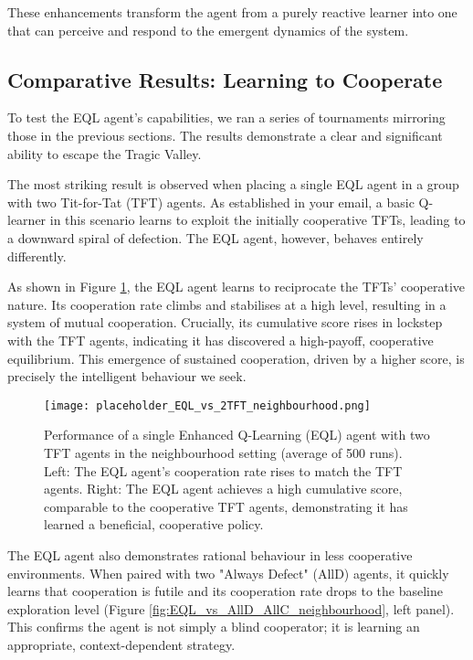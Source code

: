 \documentclass[]{llncs} %
\begin{document}
These enhancements transform the agent from a purely reactive learner into one that can perceive and respond to the emergent dynamics of the system.

\subsection{Comparative Results: Learning to Cooperate}

To test the EQL agent's capabilities, we ran a series of tournaments mirroring those in the previous sections. The results demonstrate a clear and significant ability to escape the Tragic Valley.

The most striking result is observed when placing a single EQL agent in a group with two Tit-for-Tat (TFT) agents. As established in your email, a basic Q-learner in this scenario learns to exploit the initially cooperative TFTs, leading to a downward spiral of defection. The EQL agent, however, behaves entirely differently.

As shown in Figure \ref{fig:EQL_vs_TFT_neighbourhood}, the EQL agent learns to reciprocate the TFTs' cooperative nature. Its cooperation rate climbs and stabilises at a high level, resulting in a system of mutual cooperation. Crucially, its cumulative score rises in lockstep with the TFT agents, indicating it has discovered a high-payoff, cooperative equilibrium. This emergence of sustained cooperation, driven by a higher score, is precisely the intelligent behaviour we seek.

\begin{figure}[ht]
    \centering
    \texttt{[image: placeholder\_EQL\_vs\_2TFT\_neighbourhood.png]}
    \caption{Performance of a single Enhanced Q-Learning (EQL) agent with two TFT agents in the neighbourhood setting (average of 500 runs). Left: The EQL agent's cooperation rate rises to match the TFT agents. Right: The EQL agent achieves a high cumulative score, comparable to the cooperative TFT agents, demonstrating it has learned a beneficial, cooperative policy.}
    \label{fig:EQL_vs_TFT_neighbourhood}
\end{figure}

The EQL agent also demonstrates rational behaviour in less cooperative environments. When paired with two "Always Defect" (AllD) agents, it quickly learns that cooperation is futile and its cooperation rate drops to the baseline exploration level (Figure \ref{fig:EQL_vs_AllD_AllC_neighbourhood}, left panel). This confirms the agent is not simply a blind cooperator; it is learning an appropriate, context-dependent strategy.
\end{document}
